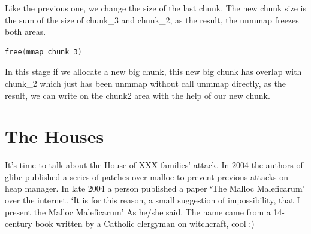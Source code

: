 \documentclass{masterthesis}
\newcommand*\libc{glibc}
\begin{document}
Like the previous one, we change the size of the last chunk. The new chunk size is the sum of the size of chunk\_3 and chunk\_2, as the result, the unmmap freezes both areas.

\begin{lstlisting}[language=c,frame=tlrb]
free(mmap_chunk_3)
 \end{lstlisting}
 
In this stage if we allocate a new big chunk, this new big chunk has overlap with chunk\_2 which just has been unmmap without call unmmap directly, as the result, we can write on the chunk2 area with the help of our new chunk.

\section{The Houses}

It's time to talk about the House of XXX families' attack. In 2004 the authors of \libc{} published a series of patches over malloc to prevent previous attacks on heap manager. In late 2004 a person published a paper ‘The Malloc Maleficarum’ over the internet. ‘It is for this reason, a small suggestion of impossibility, that I present the Malloc Maleficarum’ As he/she said. The name came from a 14-century book written by a Catholic clergyman on witchcraft, cool :)
\end{document}
